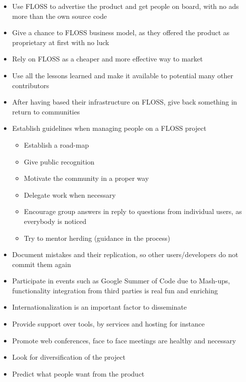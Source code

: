 \documentclass[11pt]{article} %
\begin{document}
  	\begin{itemize}
  	  \item Use FLOSS to advertise the product and get people on board, with no ads more than the own source code
  	  \item Give a chance to FLOSS business model, as they offered the product as proprietary at first with no luck
  	  \item Rely on FLOSS as a cheaper and more effective way to market
  	  \item Use all the lessons learned and make it available to potential many other contributors
  	  \item After having based their infrastructure on FLOSS, give back something in return to communities
  	  \item Establish guidelines when managing people on a FLOSS project
  	    \begin{itemize}
  	  	  \item Establish a road-map
  	  	  \item Give public recognition
  	  	  \item Motivate the community in a proper way
  	  	  \item Delegate work when necessary
  	  	  \item Encourage group answers in reply to questions from individual users, as everybody is noticed
  	  	  \item Try to mentor herding (guidance in the process)
  		\end{itemize}
  	  
  	  \item Document mistakes and their replication, so other users/developers do not commit them again
  	  \item Participate in events such as Google Summer of Code due to Mash-ups, functionality integration from third parties is real fun and enriching
  	  \item Internationalization is an important factor to disseminate
  	  \item Provide support over tools, by services and hosting for instance
  	  \item Promote web conferences, face to face meetings are healthy and necessary
  	  \item Look for diversification of the project
  	  \item Predict what people want from the product
  	\end{itemize}

\end{document}
